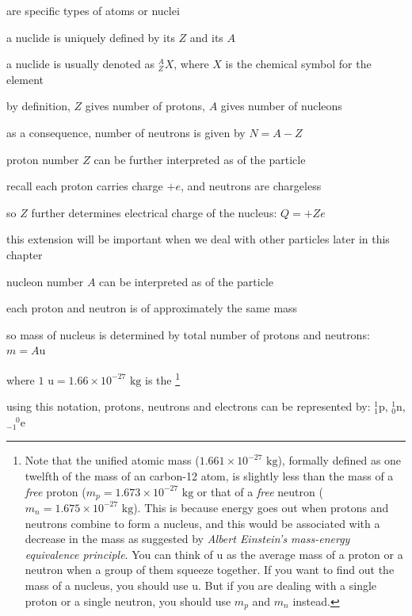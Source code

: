  are specific types of atoms or nuclei

a nuclide is uniquely defined by its  $Z$ and its  $A$

a nuclide is usually denoted as $\boxed{_Z^A X}$, where $X$ is the chemical symbol for the element

\cmt by definition, $Z$ gives number of protons, $A$ gives number of nucleons

as a consequence, number of neutrons is given by $N = A-Z$

\cmt proton number $Z$ can be further interpreted as  of the particle 

recall each proton carries charge $+e$, and neutrons are chargeless

so $Z$ further determines electrical charge of the nucleus: $\boxed{Q = +Ze}$

this extension will be important when we deal with other particles later in this chapter

\cmt nucleon number $A$ can be interpreted as  of the particle 

each proton and neutron is of approximately the same mass

so mass of nucleus is determined by total number of protons and neutrons: $\boxed{m = A\text{u}}$

where $1 \text{ u} = 1.66\times10^{-27} \text{ kg}$ is the 
\footnote{Note that the unified atomic mass ($1.661\times10^{-27} \text{ kg}$), formally defined as one twelfth of the mass of an carbon-12 atom, is slightly less than the mass of a \emph{free} proton ($m_p=1.673\times10^{-27} \text{ kg}$ or that of a \emph{free} neutron ($m_n=1.675\times10^{-27} \text{ kg}$). This is because energy goes out when protons and neutrons combine to form a nucleus, and this would be associated with a decrease in the mass as suggested by \emph{Albert Einstein's mass-energy equivalence principle}. You can think of $\text{u}$ as the average mass of a proton or a neutron when a group of them squeeze together. If you want to find out the mass of a nucleus, you should use $\text{u}$. But if you are dealing with a single proton or a single neutron, you should use $m_p$ and $m_n$ instead.}

\cmt using this notation, protons, neutrons and electrons can be represented by: $ \boxed{^1_1\text{p}}$, $\boxed{^1_0\text{n}}$, $\boxed{^{\phantom{-}0}_{-1}\text{e}} $

